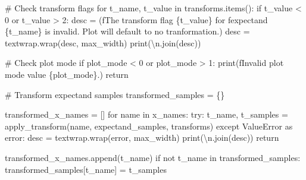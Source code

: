 \documentclass[
  letterpaper,
  DIV=11,
  numbers=noendperiod]{scrartcl}
\newenvironment{Shaded}{\begin{snugshade}}{\end{snugshade}}
\newcommand{\BuiltInTok}[1]{\textcolor[rgb]{0.00,0.23,0.31}{#1}}
\newcommand{\CharTok}[1]{\textcolor[rgb]{0.13,0.47,0.30}{#1}}
\newcommand{\CommentTok}[1]{\textcolor[rgb]{0.37,0.37,0.37}{#1}}
\newcommand{\ControlFlowTok}[1]{\textcolor[rgb]{0.00,0.23,0.31}{#1}}
\newcommand{\DecValTok}[1]{\textcolor[rgb]{0.68,0.00,0.00}{#1}}
\newcommand{\ImportTok}[1]{\textcolor[rgb]{0.00,0.46,0.62}{#1}}
\newcommand{\KeywordTok}[1]{\textcolor[rgb]{0.00,0.23,0.31}{#1}}
\newcommand{\NormalTok}[1]{\textcolor[rgb]{0.00,0.23,0.31}{#1}}
\newcommand{\OperatorTok}[1]{\textcolor[rgb]{0.37,0.37,0.37}{#1}}
\newcommand{\PreprocessorTok}[1]{\textcolor[rgb]{0.68,0.00,0.00}{#1}}
\newcommand{\SpecialCharTok}[1]{\textcolor[rgb]{0.37,0.37,0.37}{#1}}
\newcommand{\SpecialStringTok}[1]{\textcolor[rgb]{0.13,0.47,0.30}{#1}}
\newcommand{\StringTok}[1]{\textcolor[rgb]{0.13,0.47,0.30}{#1}}
\begin{document}
\begin{Shaded}
\begin{Highlighting}[]
  \CommentTok{\# Check transform flags}
  \ControlFlowTok{for}\NormalTok{ t\_name, t\_value }\KeywordTok{in}\NormalTok{ transforms.items():}
    \ControlFlowTok{if}\NormalTok{ t\_value }\OperatorTok{\textless{}} \DecValTok{0} \KeywordTok{or}\NormalTok{ t\_value }\OperatorTok{\textgreater{}} \DecValTok{2}\NormalTok{:}
\NormalTok{      desc }\OperatorTok{=}\NormalTok{ (}\SpecialStringTok{f\textquotesingle{}The transform flag }\SpecialCharTok{\{}\NormalTok{t\_value}\SpecialCharTok{\}}\SpecialStringTok{ for \textquotesingle{}}
              \SpecialStringTok{f\textquotesingle{}expectand }\SpecialCharTok{\{}\NormalTok{t\_name}\SpecialCharTok{\}}\SpecialStringTok{ is invalid.  \textquotesingle{}}
              \StringTok{\textquotesingle{}Plot will default to no tranformation.\textquotesingle{}}\NormalTok{)}
\NormalTok{      desc }\OperatorTok{=}\NormalTok{ textwrap.wrap(desc, max\_width)}
      \BuiltInTok{print}\NormalTok{(}\StringTok{\textquotesingle{}}\CharTok{\textbackslash{}n}\StringTok{\textquotesingle{}}\NormalTok{.join(desc))}
  
  \CommentTok{\# Check plot mode}
  \ControlFlowTok{if}\NormalTok{ plot\_mode }\OperatorTok{\textless{}} \DecValTok{0} \KeywordTok{or}\NormalTok{ plot\_mode }\OperatorTok{\textgreater{}} \DecValTok{1}\NormalTok{:}
    \BuiltInTok{print}\NormalTok{(}\SpecialStringTok{f\textquotesingle{}Invalid \textasciigrave{}plot mode\textasciigrave{} value }\SpecialCharTok{\{}\NormalTok{plot\_mode}\SpecialCharTok{\}}\SpecialStringTok{.\textquotesingle{}}\NormalTok{)}
    \ControlFlowTok{return}
    
  \CommentTok{\# Transform expectand samples}
\NormalTok{  transformed\_samples }\OperatorTok{=}\NormalTok{ \{\}}
  
\NormalTok{  transformed\_x\_names }\OperatorTok{=}\NormalTok{ []}
  \ControlFlowTok{for}\NormalTok{ name }\KeywordTok{in}\NormalTok{ x\_names:}
    \ControlFlowTok{try}\NormalTok{: }
\NormalTok{      t\_name, t\_samples }\OperatorTok{=}\NormalTok{ apply\_transform(name, }
\NormalTok{                                          expectand\_samples, }
\NormalTok{                                          transforms)}
    \ControlFlowTok{except} \PreprocessorTok{ValueError} \ImportTok{as}\NormalTok{ error:}
\NormalTok{      desc }\OperatorTok{=}\NormalTok{ textwrap.wrap(error, max\_width)}
      \BuiltInTok{print}\NormalTok{(}\StringTok{\textquotesingle{}}\CharTok{\textbackslash{}n}\StringTok{\textquotesingle{}}\NormalTok{.join(desc))}
      \ControlFlowTok{return}
    
\NormalTok{    transformed\_x\_names.append(t\_name)}
    \ControlFlowTok{if} \KeywordTok{not}\NormalTok{ t\_name }\KeywordTok{in}\NormalTok{ transformed\_samples:}
\NormalTok{      transformed\_samples[t\_name] }\OperatorTok{=}\NormalTok{ t\_samples}
      

\end{Highlighting}
\end{Shaded}
\end{document}
